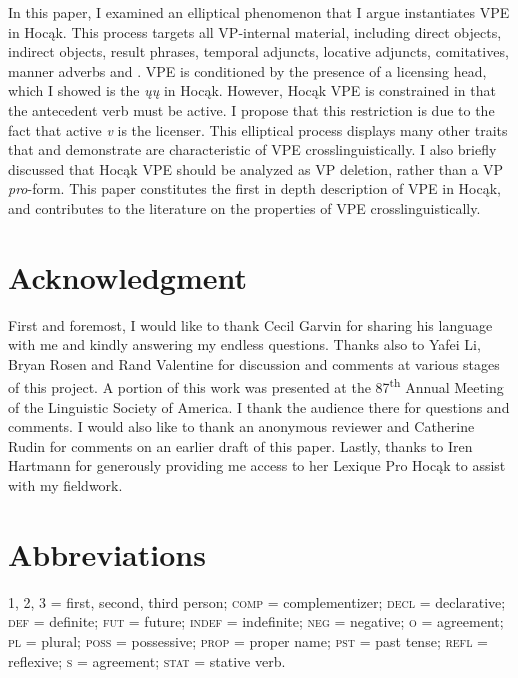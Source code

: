 \documentclass[output=paper]{LSP/langsci}
\begin{document}
 
In this paper, I examined an elliptical phenomenon that I argue instantiates VPE in Hocąk. This process targets all VP-internal material, including direct objects, indirect objects, result phrases, temporal adjuncts, locative adjuncts, comitatives, manner adverbs and  . VPE is conditioned by the presence of a licensing head, which I showed is the  \emph{ųų} in Hocąk. However, Hocąk VPE is constrained in that the antecedent verb must be active. I propose that this restriction is due to the fact that active \emph{v} is the licenser. This elliptical process displays many other traits that \citet{Goldberg2005} and \citet{Fortin2007} demonstrate are characteristic of VPE crosslinguistically. I also briefly discussed that Hocąk VPE should be analyzed as VP deletion, rather than a VP \emph{pro}-form. This paper constitutes the first in depth description of VPE in Hocąk, and contributes to the literature on the properties of VPE crosslinguistically. 
 

\section*{Acknowledgment}

First and foremost, I would like to thank Cecil Garvin for sharing his language with me and kindly answering my endless questions. Thanks also to Yafei Li, Bryan Rosen and Rand Valentine for discussion and comments at various stages of this project. A portion of this work was presented at the 87\textsuperscript{th} Annual Meeting of the Linguistic Society of America. I thank the audience there for questions and comments. I would also like to thank an anonymous reviewer and Catherine Rudin for comments on an earlier draft of this paper. Lastly, thanks to Iren Hartmann for generously providing me access to her Lexique Pro Hocąk  to assist with my fieldwork.

\section*{Abbreviations}
1, 2, 3 = first, second, third person; \textsc{comp} = complementizer; \textsc{decl} = declarative; \textsc{def} = definite; \textsc{fut} = future; \textsc{indef} = indefinite; \textsc{neg} = negative; \textsc{o} =  agreement; \textsc{pl} = plural; \textsc{poss} = possessive; \textsc{prop} = proper name; \textsc{pst} = past tense; \textsc{refl} = reflexive; \textsc{s} =  agreement; \textsc{stat} = stative verb.

{\sloppy
 \printbibliography[heading=subbibliography,notkeyword=this]
}
\end{document}
